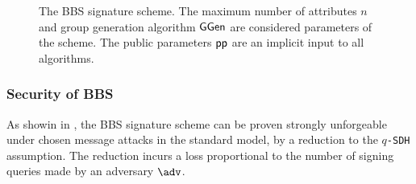 \begin{figure*}[!htb]
    \centering
  \begin{pchstack}[boxed,center,space=1em]
	  \begin{pcvstack}[,space=1em]
      \end{pcvstack}
      \begin{pcvstack}[,space=1em]
      \end{pcvstack}
    \end{pchstack}
    \caption{The BBS signature scheme. The maximum number of attributes $n$ and group generation algorithm $\mathsf{GGen}$ are considered parameters of the scheme. The public parameters $\mathsf{pp}$ are an implicit input to all algorithms.}
    \label{fig:bbs}
\end{figure*}

\subsubsection{Security of BBS} \label{sec:prelims:bbs_sec}
As showin in \cite{DBLP:conf/eurocrypt/TessaroZ23a}, the BBS signature scheme can be proven strongly unforgeable under chosen message attacks in the standard model, by a reduction to the \texttt{$q$-SDH} assumption. The reduction incurs a loss proportional to the number of signing queries made by an adversary $\adv$.

